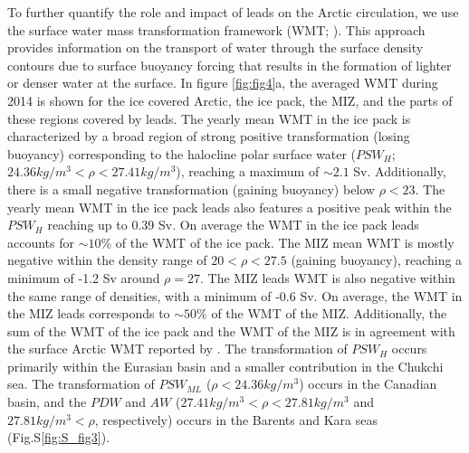 \documentclass[lineno,sn-basic]{sn-jnl}%
\begin{document}
To further quantify the role and impact of leads on the Arctic circulation, we use the surface water mass transformation framework (WMT; \citealp{Walin_WMT_1982}). This approach provides information on the transport of water through the surface density contours due to surface buoyancy forcing that results in the formation of lighter or denser water at the surface. 
In figure \ref{fig:fig4}a, the averaged WMT during 2014 is shown for the ice covered Arctic, the ice pack, the MIZ, and the parts of these regions covered by leads.
The yearly mean WMT in the ice pack is characterized by a broad region of strong positive transformation (losing buoyancy) corresponding to the halocline polar surface water ($PSW_{H}$; $24.36 kg/m^3 < \rho < 27.41 kg/m^3$), reaching a maximum of $\sim 2.1$ Sv. Additionally, there is a small negative transformation (gaining buoyancy) below $\rho < 23$. 
The yearly mean WMT in the ice pack leads also features a positive peak within the $PSW_{H}$ reaching up to 0.39 Sv. On average the WMT in the ice pack leads accounts for $\sim 10\%$ of the WMT of the ice pack. The MIZ mean WMT is mostly negative within the density range of $20 < \rho < 27.5$ (gaining buoyancy), reaching a minimum of -1.2 Sv around $\rho = 27$.  The MIZ leads WMT is also negative within the same range of densities, with a minimum of -0.6 Sv. On average, the WMT in the MIZ leads corresponds to $\sim 50\%$ of the WMT of the MIZ. Additionally, the sum of the WMT of the ice pack and the WMT of the MIZ is in agreement with the surface Arctic WMT reported by \citet{Pemberton_WMT_2015}. The transformation of $PSW_{H}$ occurs primarily within the Eurasian basin and a smaller contribution in the Chukchi sea. The transformation of $PSW_{ML}$ ($\rho < 24.36 kg/m^3$) occurs in the Canadian basin, and the $PDW$ and $AW$ ($27.41 kg/m^3 < \rho < 27.81 kg/m^3$ and $27.81 kg/m^3 < \rho$, respectively) occurs in the Barents and Kara seas (Fig.S\ref{fig:S_fig3}). 
\end{document}
